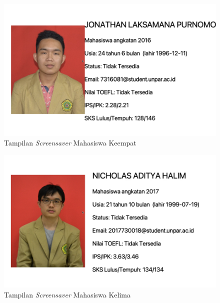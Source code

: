 \begin{figure}[H]
	\centering
	\includegraphics[scale=0.3]{Gambar/ss4.png}
	\caption{Tampilan \textit{Screensaver} Mahasiswa Keempat}
	\label{fig:5_ss4}
\end{figure}

\begin{figure}[H]
	\centering
	\includegraphics[scale=0.3]{Gambar/ss5.png}
	\caption{Tampilan \textit{Screensaver} Mahasiswa Kelima}
	\label{fig:5_ss5}
\end{figure}
